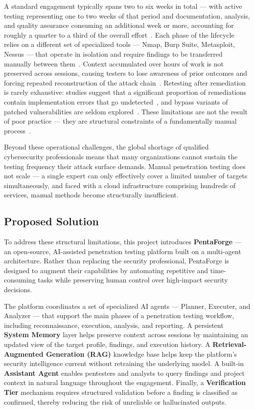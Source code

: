 \documentclass[12pt,a4paper]{report}
\begin{document}
A standard engagement typically spans two to six weeks in total --- with active
testing representing one to two weeks of that period and documentation, analysis,
and quality assurance consuming an additional week or more, accounting for roughly
a quarter to a third of the overall effort~\cite{triaxiomTimeline,valuementorLifecycle}. Each phase of the
lifecycle relies on a different set of specialized tools --- Nmap, Burp Suite,
Metasploit, Nessus --- that operate in isolation and require findings to be
transferred manually between them~\cite{autosecagent2026,emazzantiTools}. Context accumulated over
hours of work is not preserved across sessions, causing testers to lose awareness
of prior outcomes and forcing repeated reconstruction of the attack
chain~\cite{pentestgpt2023}. Retesting after remediation is rarely exhaustive: studies
suggest that a significant proportion of remediations contain implementation
errors that go undetected~\cite{hedgehogRetesting}, and bypass variants of patched
vulnerabilities are seldom explored~\cite{redleggRetesting,halockVerification}. These limitations are
not the result of poor practice --- they are structural constraints of a
fundamentally manual process~\cite{autosecagent2026,cycognitoPentest}.

Beyond these operational challenges, the global shortage of qualified cybersecurity
professionals means that many organizations cannot sustain the testing frequency
their attack surface demands. Manual penetration testing does not scale --- a
single expert can only effectively cover a limited number of targets
simultaneously, and faced with a cloud infrastructure comprising hundreds of
services, manual methods become structurally insufficient.

\subsection{Proposed Solution}

To address these structural limitations, this project introduces \textbf{PentaForge}
--- an open-source, AI-assisted penetration testing platform built on a multi-agent
architecture. Rather than replacing the security professional, PentaForge is designed
to augment their capabilities by automating repetitive and time-consuming tasks while
preserving human control over high-impact security decisions.

The platform coordinates a set of specialized AI agents --- Planner, Executer,
and Analyzer --- that support the main phases of a penetration testing workflow,
including reconnaissance, execution, analysis, and reporting. A persistent
\textbf{System Memory} layer helps preserve context across sessions by maintaining
an updated view of the target profile, findings, and execution history. A
\textbf{Retrieval-Augmented Generation (RAG)} knowledge base helps keep the
platform's security intelligence current without retraining the underlying model.
A built-in \textbf{Assistant Agent} enables pentesters and analysts to query
findings and project context in natural language throughout the engagement.
Finally, a \textbf{Verification Tier} mechanism requires structured validation
before a finding is classified as confirmed, thereby reducing the risk of unreliable
or hallucinated outputs.
\end{document}
